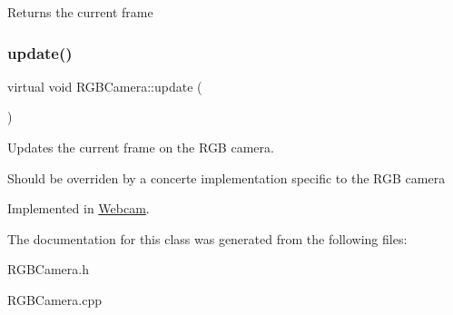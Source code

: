 \begin{DoxyReturn}{Returns}
the current frame 
\end{DoxyReturn}
\hypertarget{class_r_g_b_camera_ac9fa3f8f32605e846827b694ae7cff18}{}\label{class_r_g_b_camera_ac9fa3f8f32605e846827b694ae7cff18} 
\subsubsection{\texorpdfstring{update()}{update()}}
{\footnotesize\ttfamily virtual void R\+G\+B\+Camera\+::update (\begin{DoxyParamCaption}{ }\end{DoxyParamCaption})\hspace{0.3cm}{\ttfamily [pure virtual]}}



Updates the current frame on the R\+GB camera. 

Should be overriden by a concerte implementation specific to the R\+GB camera 

Implemented in \hyperlink{class_webcam_a3d5cab0a2b87b90b85793bc05414e503}{Webcam}.



The documentation for this class was generated from the following files\+:\begin{DoxyCompactItemize}
\item 
R\+G\+B\+Camera.\+h\item 
R\+G\+B\+Camera.\+cpp\end{DoxyCompactItemize}
